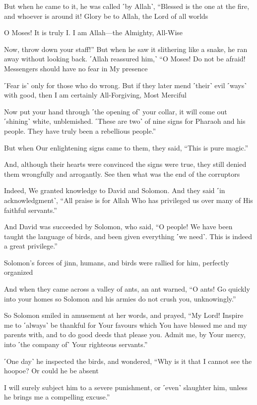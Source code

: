 But when he came to it, he was called ˹by Allah˺, “Blessed is the one at the fire, and whoever is around it! Glory be to Allah, the Lord of all worlds

O Moses! It is truly I. I am Allah—the Almighty, All-Wise

Now, throw down your staff!” But when he saw it slithering like a snake, he ran away without looking back. ˹Allah reassured him,˺ “O Moses! Do not be afraid! Messengers should have no fear in My presence

˹Fear is˺ only for those who do wrong. But if they later mend ˹their˺ evil ˹ways˺ with good, then I am certainly All-Forgiving, Most Merciful

Now put your hand through ˹the opening of˺ your collar, it will come out ˹shining˺ white, unblemished. ˹These are two˺ of nine signs for Pharaoh and his people. They have truly been a rebellious people.”

But when Our enlightening signs came to them, they said, “This is pure magic.”

And, although their hearts were convinced the signs were true, they still denied them wrongfully and arrogantly. See then what was the end of the corruptors

Indeed, We granted knowledge to David and Solomon. And they said ˹in acknowledgment˺, “All praise is for Allah Who has privileged us over many of His faithful servants.”

And David was succeeded by Solomon, who said, “O people! We have been taught the language of birds, and been given everything ˹we need˺. This is indeed a great privilege.”

Solomon’s forces of jinn, humans, and birds were rallied for him, perfectly organized

And when they came across a valley of ants, an ant warned, “O ants! Go quickly into your homes so Solomon and his armies do not crush you, unknowingly.”

So Solomon smiled in amusement at her words, and prayed, “My Lord! Inspire me to ˹always˺ be thankful for Your favours which You have blessed me and my parents with, and to do good deeds that please you. Admit me, by Your mercy, into ˹the company of˺ Your righteous servants.”

˹One day˺ he inspected the birds, and wondered, “Why is it that I cannot see the hoopoe? Or could he be absent

I will surely subject him to a severe punishment, or ˹even˺ slaughter him, unless he brings me a compelling excuse.”

